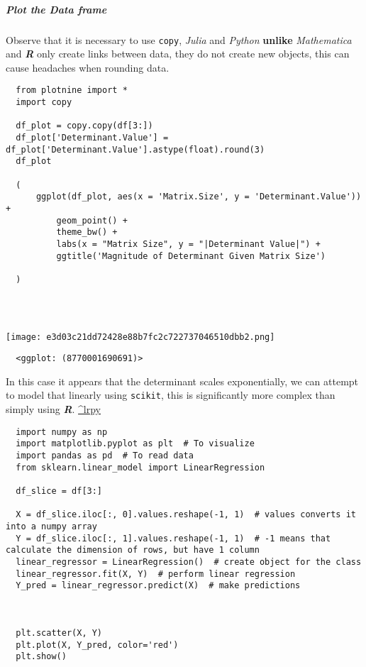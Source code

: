 \documentclass[11pt]{article}
\begin{document}
\subparagraph{Plot the Data frame}
\label{plot-the-data-frame}
Observe that it is necessary to use \texttt{copy}, \emph{Julia} and \emph{Python}
\textbf{unlike} \emph{Mathematica} and \textbf{\emph{R}} only create links between data, they do
not create new objects, this can cause headaches when rounding data.

\begin{verbatim}
  from plotnine import *
  import copy

  df_plot = copy.copy(df[3:])
  df_plot['Determinant.Value'] = df_plot['Determinant.Value'].astype(float).round(3)
  df_plot

  (
      ggplot(df_plot, aes(x = 'Matrix.Size', y = 'Determinant.Value')) +
          geom_point() +
          theme_bw() +
          labs(x = "Matrix Size", y = "|Determinant Value|") +
          ggtitle('Magnitude of Determinant Given Matrix Size')

  )




\end{verbatim}

\begin{center}
\texttt{[image: e3d03c21dd72428e88b7fc2c722737046510dbb2.png]}
\end{center}

\begin{verbatim}
  <ggplot: (8770001690691)>
\end{verbatim}

In this case it appears that the determinant scales exponentially, we
can attempt to model that linearly using \texttt{scikit}, this is significantly
more complex than simply using \textbf{\emph{R}}.
\href{https://towardsdatascience.com/linear-regression-in-6-lines-of-python-5e1d0cd05b8d}{\^{}lrpy}

\begin{verbatim}
  import numpy as np
  import matplotlib.pyplot as plt  # To visualize
  import pandas as pd  # To read data
  from sklearn.linear_model import LinearRegression

  df_slice = df[3:]

  X = df_slice.iloc[:, 0].values.reshape(-1, 1)  # values converts it into a numpy array
  Y = df_slice.iloc[:, 1].values.reshape(-1, 1)  # -1 means that calculate the dimension of rows, but have 1 column
  linear_regressor = LinearRegression()  # create object for the class
  linear_regressor.fit(X, Y)  # perform linear regression
  Y_pred = linear_regressor.predict(X)  # make predictions



  plt.scatter(X, Y)
  plt.plot(X, Y_pred, color='red')
  plt.show()
\end{verbatim}
\end{document}
